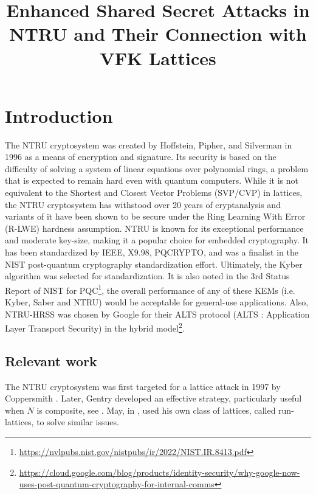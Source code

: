 \documentclass{amsart}
\numberwithin{equation}{section}
\begin{document}
	\title[Enhanced Shared Secret Attacks in NTRU]{Enhanced Shared Secret Attacks in NTRU and Their Connection with VFK Lattices}
\maketitle	
	\begin{abstract}
		\end{abstract}
\section{Introduction}
The NTRU cryptosystem was created by Hoffstein, Pipher, and Silverman in 1996 as a means of encryption and signature. Its security is based on the difficulty of solving a system of linear equations over polynomial rings, a problem that is expected to remain hard even with quantum computers. While it is not equivalent to the Shortest and Closest Vector Problems (SVP/CVP) in lattices, the NTRU cryptosystem has withstood over 20 years of cryptanalysis and variants of it have been shown to be secure under the Ring Learning With Error (R-LWE) hardness assumption. NTRU is known for its exceptional performance and moderate key-size, making it a popular choice for embedded cryptography. It has been standardized by IEEE, X9.98, PQCRYPTO, and was a finalist in the NIST post-quantum cryptography standardization effort. Ultimately, the Kyber algorithm was selected for standardization. It is also noted in the  3rd Status Report of NIST for PQC\footnote{\url{https://nvlpubs.nist.gov/nistpubs/ir/2022/NIST.IR.8413.pdf}}, the overall performance of any of these KEMs (i.e. Kyber, Saber and NTRU) would be acceptable for general-use applications. Also, NTRU-HRSS was chosen by Google for their ALTS protocol (ALTS : Application Layer Transport Security) in the hybrid model\footnote{\url{https://cloud.google.com/blog/products/identity-security/why-google-now-uses-post-quantum-cryptography-for-internal-comms}}.

\subsection{Relevant work}

The NTRU cryptosystem was first targeted for a lattice attack in 1997 by Coppersmith \cite{CopSha97}. Later, Gentry developed an effective strategy, particularly useful when $N$ is composite, see \cite{gentry}. May, in \cite{May}, used his own class of lattices, called run-lattices, to solve similar issues. 
\end{document}
